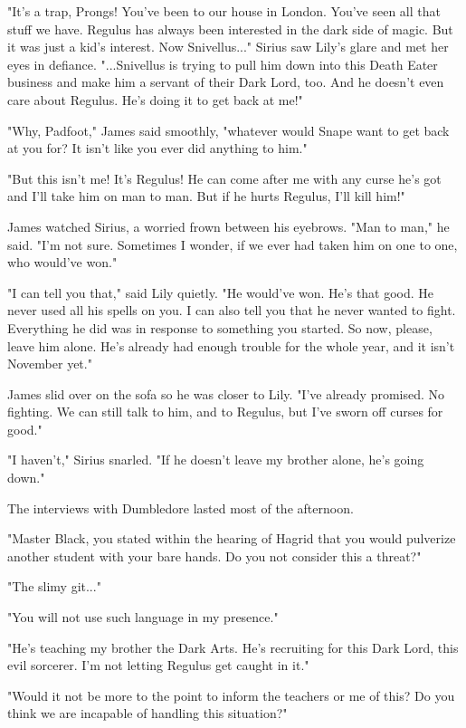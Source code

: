 \documentclass[a4paper,11pt]{article}
\begin{document}
"It's a trap, Prongs! You've been to our house in London. You've seen all that stuff we have. Regulus has always been interested in the dark side of magic. But it was just a kid's interest. Now Snivellus..." Sirius saw Lily's glare and met her eyes in defiance. "...Snivellus is trying to pull him down into this Death Eater business and make him a servant of their Dark Lord, too. And he doesn't even care about Regulus. He's doing it to get back at me!"

"Why, Padfoot," James said smoothly, "whatever would Snape want to get back at you for? It isn't like you ever did anything to him."

"But this isn't me! It's Regulus! He can come after me with any curse he's got and I'll take him on man to man. But if he hurts Regulus, I'll kill him!"

James watched Sirius, a worried frown between his eyebrows. "Man to man," he said. "I'm not sure. Sometimes I wonder, if we ever had taken him on one to one, who would've won."

"I can tell you that," said Lily quietly. "He would've won. He's that good. He never used all his spells on you. I can also tell you that he never wanted to fight. Everything he did was in response to something you started. So now, please, leave him alone. He's already had enough trouble for the whole year, and it isn't November yet."

James slid over on the sofa so he was closer to Lily. "I've already promised. No fighting. We can still talk to him, and to Regulus, but I've sworn off curses for good."

"I haven't," Sirius snarled. "If he doesn't leave my brother alone, he's going down."

The interviews with Dumbledore lasted most of the afternoon.

"Master Black, you stated within the hearing of Hagrid that you would pulverize another student with your bare hands. Do you not consider this a threat?"

"The slimy git..."

"You will not use such language in my presence."

"He's teaching my brother the Dark Arts. He's recruiting for this Dark Lord, this evil sorcerer. I'm not letting Regulus get caught in it."

"Would it not be more to the point to inform the teachers or me of this? Do you think we are incapable of handling this situation?"
\end{document}
